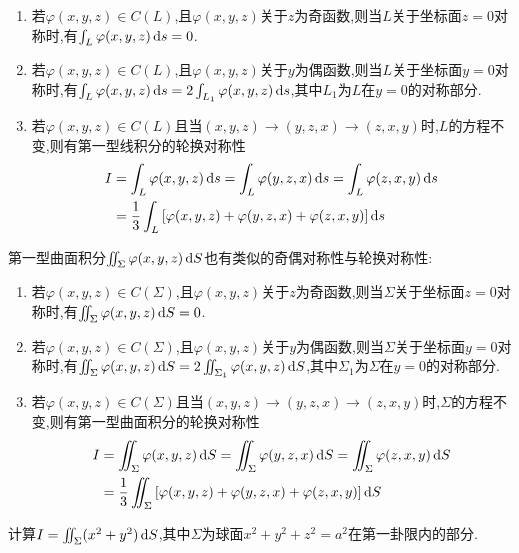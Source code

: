 \begin{enumerate}
    \item 若$\varphi(x,y,z) \in C(L)$,且$\varphi(x,y,z)$关于$z$为奇函数,则当$L$关于坐标面$z=0$对称时,有$\int_L \varphi(x,y,z) \operatorname{d\!} s = 0$.
    \item 若$\varphi(x,y,z) \in C(L)$,且$\varphi(x,y,z)$关于$y$为偶函数,则当$L$关于坐标面$y=0$对称时,有$\int_L \varphi(x,y,z) \operatorname{d\!} s = 2 \int_{L_1} \varphi(x,y,z) \operatorname{d\!} s$,其中$L_1$为$L$在$y=0$的对称部分.
    \item 若$\varphi(x,y,z) \in C(L)$且当$(x,y,z) \to (y,z,x) \to (z,x,y)$时,$L$的方程不变,则有第一型线积分的轮换对称性
    \begin{align*}
        I &= \int_L \varphi(x,y,z) \operatorname{d\!} s = \int_L \varphi(y,z,x) \operatorname{d\!} s = \int_L \varphi(z,x,y) \operatorname{d\!} s\\
        &= \frac{1}{3} \int_L \left[ \varphi(x,y,z) + \varphi(y,z,x) + \varphi(z,x,y) \right] \operatorname{d\!} s\\
    \end{align*}
\end{enumerate}



第一型曲面积分$\iint_\Sigma \varphi(x,y,z) \operatorname{d\!} S$也有类似的奇偶对称性与轮换对称性:
\begin{enumerate}
    \item 若$\varphi(x,y,z) \in C(\Sigma)$,且$\varphi(x,y,z)$关于$z$为奇函数,则当$\Sigma$关于坐标面$z=0$对称时,有$\iint_\Sigma \varphi(x,y,z) \operatorname{d\!} S = 0$.
    \item 若$\varphi(x,y,z) \in C(\Sigma)$,且$\varphi(x,y,z)$关于$y$为偶函数,则当$\Sigma$关于坐标面$y=0$对称时,有$\iint_\Sigma \varphi(x,y,z) \operatorname{d\!} S = 2 \iint_{\Sigma_1} \varphi(x,y,z) \operatorname{d\!} S$,其中$\Sigma_1$为$\Sigma$在$y=0$的对称部分.
    \item 若$\varphi(x,y,z) \in C(\Sigma)$且当$(x,y,z) \to (y,z,x) \to (z,x,y)$时,$\Sigma$的方程不变,则有第一型曲面积分的轮换对称性
    \begin{align*}
        I &= \iint_\Sigma \varphi(x,y,z) \operatorname{d\!} S = \iint_\Sigma \varphi(y,z,x) \operatorname{d\!} S = \iint_\Sigma \varphi(z,x,y) \operatorname{d\!} S\\
        &= \frac{1}{3} \iint_\Sigma \left[ \varphi(x,y,z) + \varphi(y,z,x) + \varphi(z,x,y) \right] \operatorname{d\!} S\\
    \end{align*}
\end{enumerate}


\begin{example}
    计算$I = \iint_\Sigma (x^2 + y^2) \operatorname{d\!} S$,其中$\Sigma$为球面$x^2 + y^2 + z^2 = a^2$在第一卦限内的部分.
\end{example}

